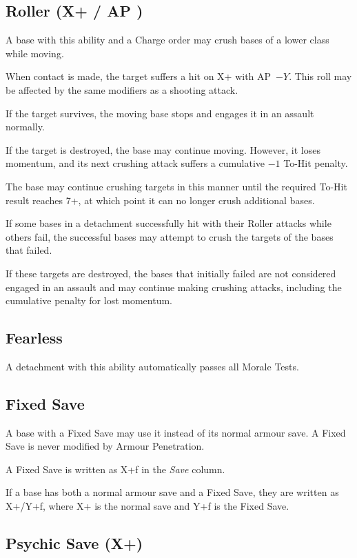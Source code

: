 \subsection{Roller (X+ / AP )}

A base with this ability and a Charge order may crush bases of a lower class while moving.

When contact is made, the target suffers a hit on X+ with AP~$-Y$. This roll may be affected by the same modifiers as a shooting attack.

If the target survives, the moving base stops and engages it in an assault normally.

If the target is destroyed, the base may continue moving. However, it loses momentum, and its next crushing attack suffers a cumulative $-1$ To-Hit penalty.

The base may continue crushing targets in this manner until the required To-Hit result reaches 7+, at which point it can no longer crush additional bases.

If some bases in a detachment successfully hit with their Roller attacks while others fail, the successful bases may attempt to crush the targets of the bases that failed.

If these targets are destroyed, the bases that initially failed are not considered engaged in an assault and may continue making crushing attacks, including the cumulative penalty for lost momentum.

\subsection{Fearless}

A detachment with this ability automatically passes all Morale Tests.

\subsection{Fixed Save}

A base with a Fixed Save may use it instead of its normal armour save. A Fixed Save is never modified by Armour Penetration.

A Fixed Save is written as X+f in the \textit{Save} column.

If a base has both a normal armour save and a Fixed Save, they are written as X+/Y+f, where X+ is the normal save and Y+f is the Fixed Save.

\subsection{Psychic Save (X+)}

